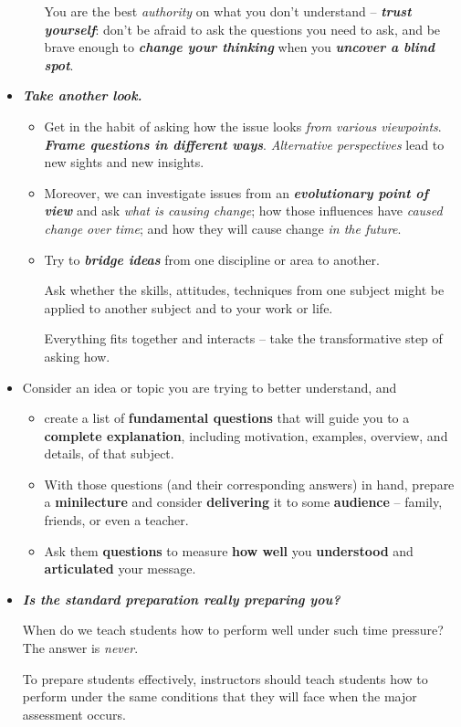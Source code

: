 \documentclass[11pt]{article}
\begin{document}
\begin{itemize}
\begin{itemize}
You are the best \emph{authority} on what you don’t understand -- \emph{\textbf{trust yourself}}: don’t be afraid to ask the questions you need to ask, and be brave enough to \emph{\textbf{change your thinking}} when you \emph{\textbf{uncover a blind spot}}.
\end{itemize}

\item \emph{\textbf{Take another look.}}
\begin{itemize}
\item Get in the habit of asking how the issue looks \emph{from various viewpoints}. \emph{\textbf{Frame questions in different ways}}. \emph{Alternative perspectives} lead to new sights and new insights. 

\item Moreover, we can investigate issues from an \emph{\textbf{evolutionary point of view}} and ask \emph{what is causing change}; how those influences have \emph{caused change over time}; and how they will cause change \emph{in the future}. 

\item Try to \emph{\textbf{bridge ideas}} from one discipline or area to another. 

Ask whether the skills, attitudes, techniques from one subject might be applied to another subject and to your work or life. 

Everything fits together and interacts -- take the transformative step of asking how.
\end{itemize}

\item \begin{exercise}
Consider an idea or topic you are trying to better understand, and
\begin{itemize}
\item create a list of \textbf{fundamental questions} that will guide you to a \textbf{complete explanation}, including motivation, examples, overview, and details, of that subject.

\item With those questions (and their corresponding answers) in hand, prepare a \textbf{minilecture} and consider \textbf{delivering} it to some \textbf{audience} -- family, friends, or even a teacher. 

\item Ask them \textbf{questions} to measure \textbf{how well} you \textbf{understood} and \textbf{articulated} your message.
\end{itemize}
\end{exercise}

\item \emph{\textbf{Is the standard preparation really preparing you?}}

When do we teach students how to perform well under such time pressure? The answer is \emph{never}. 

To prepare students effectively, instructors should teach students how to perform under the same conditions that they will face when the major assessment occurs. 
\end{itemize}
\end{document}
